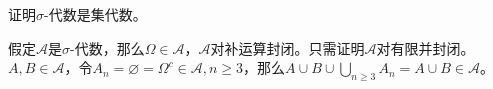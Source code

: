 \documentclass{ctexart}
\newif\ifpreface
\begin{document}
\large
\setlength{\baselineskip}{1.2em}
\ifpreface

\newgeometry{left=2cm,right=2cm,top=2cm,bottom=2cm}
\else
{}
\maketitle
\fi
\begin{problem}\label{pro:1.4.2}
  证明\(\sigma \)-代数是集代数。
\end{problem}
\begin{solution}
  假定\(\mathcal{A}\)是\(\sigma\)-代数，那么\(\Omega \in \mathcal{A} \)，\(\mathcal{A}\)对补运算封闭。只需证明\(\mathcal{A}\)对有限并封闭。
  \(A,B \in \mathcal{A}\)，令\(A_n=\varnothing=\Omega^c \in \mathcal{A}, n \geq 3\)，那么\(A \cup B \cup \bigcup_{n \geq 3}A_n=A \cup B \in \mathcal{A}\)。
\end{solution}
\end{document}
